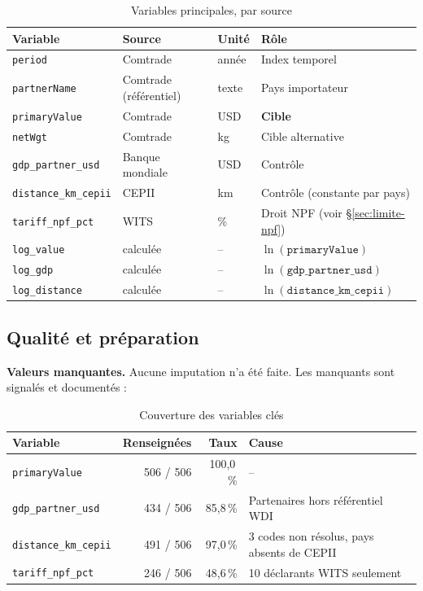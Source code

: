 \documentclass[11pt,a4paper]{article}
\begin{document}
\begin{table}[H]
\centering
\caption{Variables principales, par source}\label{tab:variables}
\small
\begin{tabular}{llll}
\toprule
\textbf{Variable} & \textbf{Source} & \textbf{Unité} & \textbf{Rôle} \\
\midrule
\texttt{period} & Comtrade & année & Index temporel \\
\texttt{partnerName} & Comtrade (référentiel) & texte & Pays importateur \\
\texttt{primaryValue} & Comtrade & USD & \textbf{Cible} \\
\texttt{netWgt} & Comtrade & kg & Cible alternative \\
\texttt{gdp\_partner\_usd} & Banque mondiale & USD & Contrôle \\
\texttt{distance\_km\_cepii} & CEPII & km & Contrôle (constante par pays) \\
\texttt{tariff\_npf\_pct} & WITS & \% & Droit NPF (voir §\ref{sec:limite-npf}) \\
\texttt{log\_value} & calculée & -- & $\ln(\texttt{primaryValue})$ \\
\texttt{log\_gdp} & calculée & -- & $\ln(\texttt{gdp\_partner\_usd})$ \\
\texttt{log\_distance} & calculée & -- & $\ln(\texttt{distance\_km\_cepii})$ \\
\bottomrule
\end{tabular}
\end{table}

\subsection{Qualité et préparation}

\textbf{Valeurs manquantes.} Aucune imputation n'a été faite. Les manquants sont
signalés et documentés :

\begin{table}[H]
\centering
\caption{Couverture des variables clés}\label{tab:couverture}
\small
\begin{tabular}{lrrl}
\toprule
\textbf{Variable} & \textbf{Renseignées} & \textbf{Taux} & \textbf{Cause} \\
\midrule
\texttt{primaryValue} & 506 / 506 & 100,0\,\% & -- \\
\texttt{gdp\_partner\_usd} & 434 / 506 & 85,8\,\% & Partenaires hors référentiel WDI \\
\texttt{distance\_km\_cepii} & 491 / 506 & 97,0\,\% & 3 codes non résolus, pays absents de CEPII \\
\texttt{tariff\_npf\_pct} & 246 / 506 & 48,6\,\% & 10 déclarants WITS seulement \\
\bottomrule
\end{tabular}
\end{table}
\end{document}
